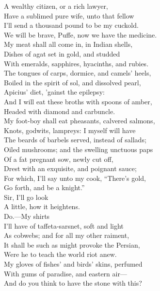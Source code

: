 \documentclass[a4paper,oneside,12pt]{memoir}
\begin{document}
\begin{drama*}
A wealthy citizen, or a rich lawyer,\\
Have a sublimed pure wife, unto that fellow\\
I'll send a thousand pound to be my cuckold.\\
We will be brave, Puffe, now we have the medicine.\\
My meat shall all come in, in Indian shells,\\
Dishes of agat set in gold, and studded\\
With emeralds, sapphires, hyacinths, and rubies.\\
The tongues of carps, dormice, and camels' heels,\\
Boiled in the spirit of sol, and dissolved pearl,\\
Apicius' diet, 'gainst the epilepsy:\\
And I will eat these broths with spoons of amber,\\
Headed with diamond and carbuncle.\\
My foot-boy shall eat pheasants, calvered salmons,\\
Knots, godwits, lampreys: I myself will have\\
The beards of barbels served, instead of sallads;\\
Oiled mushrooms; and the swelling unctuous paps\\
Of a fat pregnant sow, newly cut off,\\
Drest with an exquisite, and poignant sauce;\\
For which, I'll say unto my cook, ``There's gold,\\
Go forth, and be a knight.''\\
\facespeaks {} Sir, I'll go look\\
A little, how it heightens.\\
\mammonspeaks {} Do.---My shirts\\
I'll have of taffeta-sarsnet, soft and light\\
As cobwebs; and for all my other raiment,\\
It shall be such as might provoke the Persian,\\
Were he to teach the world riot anew.\\
My gloves of fishes' and birds' skins, perfumed\\
With gums of paradise, and eastern air---\\
\surlyspeaks And do you think to have the stone with this?\\

\end{drama*}
\end{document}
